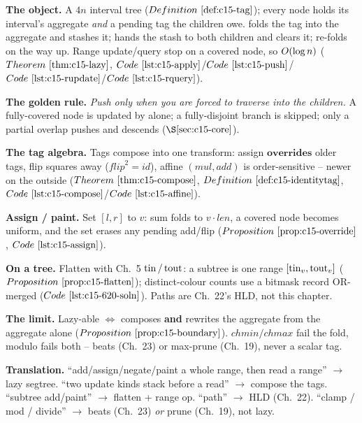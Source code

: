\begin{quickref}
\textbf{The object.} A \(4n\) interval tree (\(\defref{c15-tag}\)); every node holds
its interval's aggregate \emph{and} a pending tag the children owe. 
folds the tag into the aggregate and stashes it;  hands the stash to both
children and clears it;  re-folds on the way up. Range update/query stop on
a covered node, so \(O(\log n)\) (\(\thmref{c15-lazy}\),
\(\coderef{c15-apply}\)/\(\coderef{c15-push}\)/\(\coderef{c15-rupdate}\)/\(\coderef{c15-rquery}\)).

\medskip
\textbf{The golden rule.} \emph{Push only when you are forced to traverse into the
children.} A fully-covered node is updated by  alone; a fully-disjoint
branch is skipped; only a partial overlap pushes and descends (\(\secref{c15-core}\)).

\medskip
\textbf{The tag algebra.} Tags compose into one transform: assign \(\mathbf{overrides}\)
older tags, flip squares away (\(\mathit{flip}^2{=}\mathit{id}\)), affine
\((\mathit{mul},\mathit{add})\) is order-sensitive -- newer on the outside
(\(\thmref{c15-compose}\), \(\defref{c15-identitytag}\), \(\coderef{c15-compose}\)/\(\coderef{c15-affine}\)).

\medskip
\textbf{Assign / paint.} Set \([l,r]\) to \(v\): sum folds to \(v\cdot\mathit{len}\), a
covered node becomes uniform, and the set erases any pending add/flip
(\(\propref{c15-override}\), \(\coderef{c15-assign}\)).

\medskip
\textbf{On a tree.} Flatten with Ch.~5 \(\operatorname{tin}/\operatorname{tout}\): a subtree is one range
\([\operatorname{tin}_v,\operatorname{tout}_v]\) (\(\propref{c15-flatten}\)); distinct-colour counts use a bitmask
record OR-merged (\(\coderef{c15-620-soln}\)). Paths are Ch.~22's HLD, not this chapter.

\medskip
\textbf{The limit.} Lazy-able \(\iff\) composes \textbf{and} rewrites the aggregate from
the aggregate alone (\(\propref{c15-boundary}\)). \(\mathit{chmin}/\mathit{chmax}\) fail
the fold, modulo fails both -- beats (Ch.~23) or max-prune (Ch.~19), never a scalar tag.

\medskip
\textbf{Translation.} ``add/assign/negate/paint a whole range, then read a range''
\(\to\) lazy segtree. ``two update kinds stack before a read'' \(\to\) compose the tags.
``subtree add/paint'' \(\to\) flatten + range op. ``path'' \(\to\) HLD (Ch.~22). ``clamp /
mod / divide'' \(\to\) beats (Ch.~23) \emph{or} prune (Ch.~19), not lazy.
\end{quickref}

